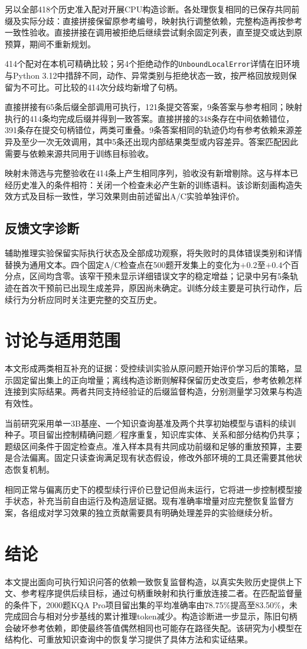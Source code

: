 另以全部418个历史准入配对开展CPU构造诊断。各处理恢复相同的已保存共同前缀及实际分歧：直接拼接保留原参考编号，映射执行调整依赖，完整构造再按参考一致性验收。直接拼接在调用被拒绝后继续尝试剩余固定列表，直至提交或达到原预算，期间不重新规划。

414个配对在本机可精确比较；另4个拒绝动作的\texttt{UnboundLocalError}详情在旧环境与Python 3.12中措辞不同，动作、异常类别与拒绝状态一致，按严格回放规则保留为不可比。可比较的414次分歧均新增了句柄。

直接拼接有65条后缀全部调用可执行，121条提交答案，9条答案与参考相同；映射执行的414条均完成后缀并得到一致答案。直接拼接的348条存在中间依赖错位，391条存在提交句柄错位，两类可重叠。9条答案相同的轨迹仍均有参考依赖来源差异及至少一次无效调用，其中5条还出现内部结果类型或内容差异。答案匹配因此需要与依赖来源共同用于训练目标验收。

映射未筛选与完整验收在414条上产生相同序列，验收没有新增剔除。这与样本已经历史准入的条件相符：关闭一个检查未必产生新的训练语料。该诊断刻画构造失效方式及目标一致性，学习效果则由前述留出A/C实验单独评价。

\subsection{反馈文字诊断}

辅助推理实验保留实际执行状态及全部成功观察，将失败时的具体错误类别和详情替换为通用文本。四个固定A/C检查点在500题开发集上的变化为$+0.2$至$+0.4$个百分点，区间均含零。该窄干预未显示详细错误文字的稳定增益；记录中另有5条轨迹在首次干预前已出现生成差异，原因尚未确定。训练分歧主要是可执行动作，后续行为分析应同时关注更完整的交互历史。

\section{讨论与适用范围}

本文形成两类相互补充的证据：受控续训实验从原问题开始评价学习后的策略，显示固定留出集上的正向增量；离线构造诊断则解释保留历史改变后，参考依赖怎样连接到实际结果。两者共同支持经验证的后缀监督构造，分别测量学习效果与构造有效性。

当前研究采用单一3B基座、一个知识查询基准及两个共享初始模型与语料的续训种子。项目留出控制精确问题／程序重复，知识库实体、关系和部分结构仍共享；题级区间条件于固定检查点。准入样本具有共同成功前缀和足够的重放预算，主要是合法偏离。固定只读查询满足现有状态假设，修改外部环境的工具还需要其他状态恢复机制。

相同正常与偏离历史下的模型续行评价已登记但尚未运行，它将进一步控制模型接手状态，补充当前自由运行及构造层证据。现有准确率增量对应完整恢复监督方案，各组成对学习效果的独立贡献需要具有明确处理差异的实验继续分析。

\section{结论}

本文提出面向可执行知识问答的依赖一致恢复监督构造，以真实失败历史提供上下文、参考程序提供后续目标，通过句柄重映射和执行重放连接二者。在匹配监督量的条件下，2000题KQA Pro项目留出集的平均准确率由78.75\%提高至83.50\%，未完成回合与相对分步基线的累计推理token减少。构造诊断进一步显示，陈旧句柄会破坏参考依赖，即使最终答值偶然相同也可能存在路径失配。该研究为小模型在结构化、可重放知识查询中的恢复学习提供了具体方法和实证结果。
